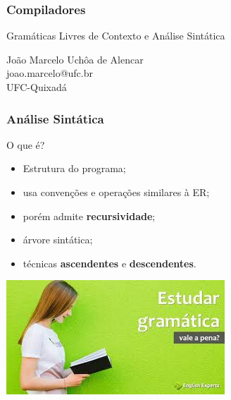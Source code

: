 \documentclass[table]{beamer}
\begin{document}
\begin{frame}
   \frametitle{Compiladores}
   \large
   \begin{center}
   Gramáticas Livres de Contexto e Análise Sintática
   \end{center}
   \scriptsize
   \begin{center}
      João Marcelo Uchôa de Alencar \\
      joao.marcelo@ufc.br \\
      UFC-Quixadá
   \end{center}
\end{frame}

\begin{frame}
   \tableofcontents
\end{frame}

\begin{frame}
   \frametitle{Análise Sintática}
   \begin{block}{O que é?}
      \begin{itemize}
         \item Estrutura do programa;
	 \item usa convenções e operações similares à ER;
	 \item porém admite \textbf{recursividade};
	 \item árvore sintática;
	 \item técnicas \textbf{ascendentes} e \textbf{descendentes}.
      \end{itemize}
   \end{block}
   \centering
   \includegraphics[scale=0.7]{figuras/estudargramatica.jpeg}
\end{frame}
\end{document}
